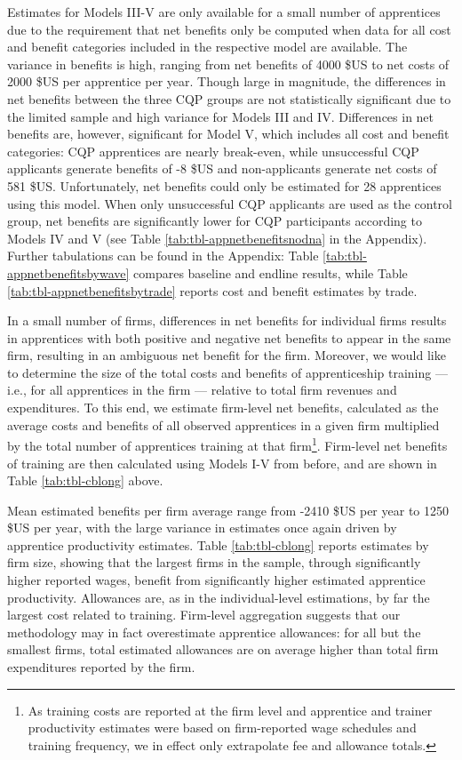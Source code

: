 \documentclass[
  a4paper, twoside, 12pt]{book}
\begin{document}
Estimates for Models III-V are only available for a small number of apprentices due to the requirement that net benefits only be computed when data for all cost and benefit categories included in the respective model are available. The variance in benefits is high, ranging from net benefits of 4000 \$US to net costs of 2000 \$US per apprentice per year. Though large in magnitude, the differences in net benefits between the three CQP groups are not statistically significant due to the limited sample and high variance for Models III and IV. Differences in net benefits are, however, significant for Model V, which includes all cost and benefit categories: CQP apprentices are nearly break-even, while unsuccessful CQP applicants generate benefits of -8 \$US and non-applicants generate net costs of 581 \$US. Unfortunately, net benefits could only be estimated for 28 apprentices using this model. When only unsuccessful CQP applicants are used as the control group, net benefits are significantly lower for CQP participants according to Models IV and V (see Table \ref{tab:tbl-appnetbenefitsnodna} in the Appendix). Further tabulations can be found in the Appendix: Table \ref{tab:tbl-appnetbenefitsbywave} compares baseline and endline results, while Table \ref{tab:tbl-appnetbenefitsbytrade} reports cost and benefit estimates by trade.

In a small number of firms, differences in net benefits for individual firms results in apprentices with both positive and negative net benefits to appear in the same firm, resulting in an ambiguous net benefit for the firm. Moreover, we would like to determine the size of the total costs and benefits of apprenticeship training --- i.e., for all apprentices in the firm --- relative to total firm revenues and expenditures. To this end, we estimate firm-level net benefits, calculated as the average costs and benefits of all observed apprentices in a given firm multiplied by the total number of apprentices training at that firm\footnote{As training costs are reported at the firm level and apprentice and trainer productivity estimates were based on firm-reported wage schedules and training frequency, we in effect only extrapolate fee and allowance totals.}. Firm-level net benefits of training are then calculated using Models I-V from before, and are shown in Table \ref{tab:tbl-cblong} above.

Mean estimated benefits per firm average range from -2410 \$US per year to 1250 \$US per year, with the large variance in estimates once again driven by apprentice productivity estimates. Table \ref{tab:tbl-cblong} reports estimates by firm size, showing that the largest firms in the sample, through significantly higher reported wages, benefit from significantly higher estimated apprentice productivity. Allowances are, as in the individual-level estimations, by far the largest cost related to training. Firm-level aggregation suggests that our methodology may in fact overestimate apprentice allowances: for all but the smallest firms, total estimated allowances are on average higher than total firm expenditures reported by the firm.
\end{document}
